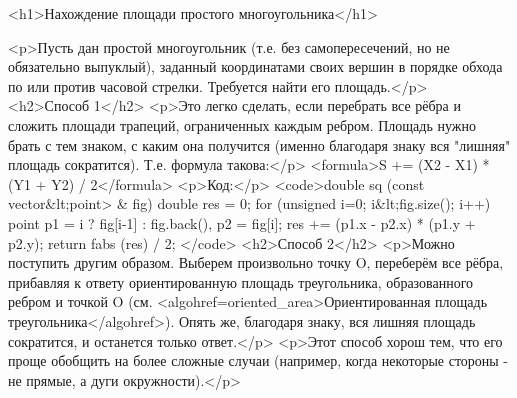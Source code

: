 <h1>Нахождение площади простого многоугольника</h1>

<p>Пусть дан простой многоугольник (т.е. без самопересечений, но не обязательно выпуклый), заданный координатами своих вершин в порядке обхода по или против часовой стрелки. Требуется найти его площадь.</p>
<h2>Способ 1</h2>
<p>Это легко сделать, если перебрать все рёбра и сложить площади трапеций, ограниченных каждым ребром. Площадь нужно брать с тем знаком, с каким она получится (именно благодаря знаку вся "лишняя" площадь сократится). Т.е. формула такова:</p>
<formula>S += (X2 - X1) * (Y1 + Y2) / 2</formula>
<p>Код:</p>
<code>double sq (const vector&lt;point> & fig)
{
	double res = 0;
	for (unsigned i=0; i&lt;fig.size(); i++)
	{
		point
			p1 = i ? fig[i-1] : fig.back(),
			p2 = fig[i];
		res += (p1.x - p2.x) * (p1.y + p2.y);
	}
	return fabs (res) / 2;
}</code>
<h2>Способ 2</h2>
<p>Можно поступить другим образом. Выберем произвольно точку O, переберём все рёбра, прибавляя к ответу ориентированную площадь треугольника, образованного ребром и точкой O (см. <algohref=oriented_area>Ориентированная площадь треугольника</algohref>). Опять же, благодаря знаку, вся лишняя площадь сократится, и останется только ответ.</p>
<p>Этот способ хорош тем, что его проще обобщить на более сложные случаи (например, когда некоторые стороны - не прямые, а дуги окружности).</p>
